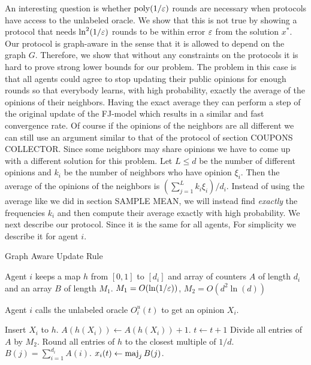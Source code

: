 An interesting question is whether $\mathrm{poly}(1/\varepsilon)$ rounds
are necessary when protocols have access to the unlabeled oracle.
We show that this is not true by showing a protocol
that needs $\ln^2(1/\varepsilon)$ rounds to be within error $\varepsilon$ from
the solution $x^*$. Our protocol is graph-aware in the sense that
it is allowed to depend on the graph $G$. Therefore, we show that
without any constraints on the protocols it is hard to prove strong
lower bounds for our problem. The problem in this case is that
all agents could agree to stop updating their public opinions for
enough rounds so that everybody learns, with high probability, exactly
the average of the opinions of their neighbors. Having the exact
average they can perform a step of the original update of the FJ-model
which results in a similar and fast convergence rate.
Of course if the opinions of the neighbors are all different we can still
use an argument similar to that of the protocol of section COUPONS COLLECTOR.
Since some neighbors may share opinions we have to come up with a different
solution for this problem. Let $L \leq d$ be the number of different
opinions and $k_i$ be the number of neighbors who have opinion $\xi_i$.
Then the average of the opinions of the neighbors is
$(\sum_{j = 1}^L k_i \xi_i)/d_i$. Instead of using the average like
we did in section SAMPLE MEAN, we will instead find \emph{exactly}
the frequencies $k_i$ and then compute their average exactly with high
probability.
We next describe our protocol. Since it is the same for all agents,
For simplicity we describe it for agent $i$.
\begin{algorithm}
  \caption{Graph Aware Update Rule}
  \label{alg:frequencies}
  \begin{algorithmic}[1]
    \State Agent $i$ keeps a map $h$ from $[0,1]$ to $[d_i]$
    and array of counters $A$ of length $d_i$ and an array $B$ of length
    $M_1$.
    \State $M_1 = O(\ln(1/\varepsilon))$,
    $M_2 = O(d^2 \ln(d))$


    \State Agent $i$ calls the unlabeled oracle $O_i^u(t)$ to get
    an opinion $X_i$.

      \State Insert $X_i$ to $h$.
    \Else
      \State $A(h(X_i)) \gets A(h(X_i)) +1$.
    \EndIf
  \State $t \gets t+1$
\EndFor
  \State Divide all entries of $A$ by $M_2$.  \label{alg:line:counters}
  \State Round all entries of $h$ to the closest multiple of $1/d$.
  \State $B(j) = \sum_{i=1}^{d_i} A(i)$.
\EndFor
\State $x_i(t) \gets \operatorname*{maj}_{j} B(j)$.
\end{algorithmic}
\end{algorithm}

